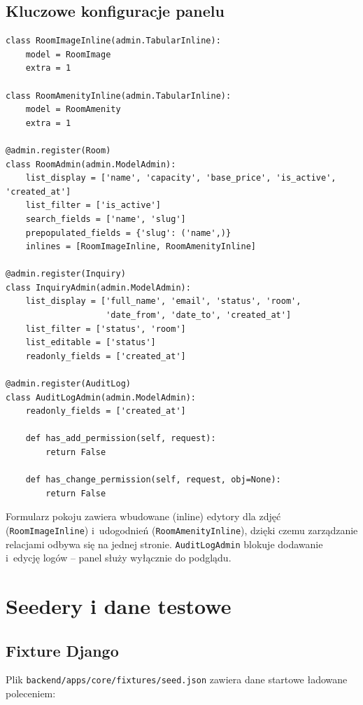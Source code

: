 \documentclass[12pt,a4paper]{article}
\begin{document}
\subsection{Kluczowe konfiguracje panelu}

\begin{lstlisting}[style=pythonstyle, caption={Konfiguracja Django Admin (admin.py)}]
class RoomImageInline(admin.TabularInline):
    model = RoomImage
    extra = 1

class RoomAmenityInline(admin.TabularInline):
    model = RoomAmenity
    extra = 1

@admin.register(Room)
class RoomAdmin(admin.ModelAdmin):
    list_display = ['name', 'capacity', 'base_price', 'is_active', 'created_at']
    list_filter = ['is_active']
    search_fields = ['name', 'slug']
    prepopulated_fields = {'slug': ('name',)}
    inlines = [RoomImageInline, RoomAmenityInline]

@admin.register(Inquiry)
class InquiryAdmin(admin.ModelAdmin):
    list_display = ['full_name', 'email', 'status', 'room',
                    'date_from', 'date_to', 'created_at']
    list_filter = ['status', 'room']
    list_editable = ['status']
    readonly_fields = ['created_at']

@admin.register(AuditLog)
class AuditLogAdmin(admin.ModelAdmin):
    readonly_fields = ['created_at']

    def has_add_permission(self, request):
        return False

    def has_change_permission(self, request, obj=None):
        return False
\end{lstlisting}

Formularz pokoju zawiera wbudowane (inline) edytory dla zdjęć
(\texttt{RoomImageInline}) i~udogodnień (\texttt{RoomAmenityInline}),
dzięki czemu zarządzanie relacjami odbywa się na jednej stronie.
\texttt{AuditLogAdmin} blokuje dodawanie i~edycję logów -- panel służy
wyłącznie do podglądu.

\section{Seedery i dane testowe}

\subsection{Fixture Django}

Plik \texttt{backend/apps/core/fixtures/seed.json} zawiera dane startowe
ładowane poleceniem:
\end{document}

